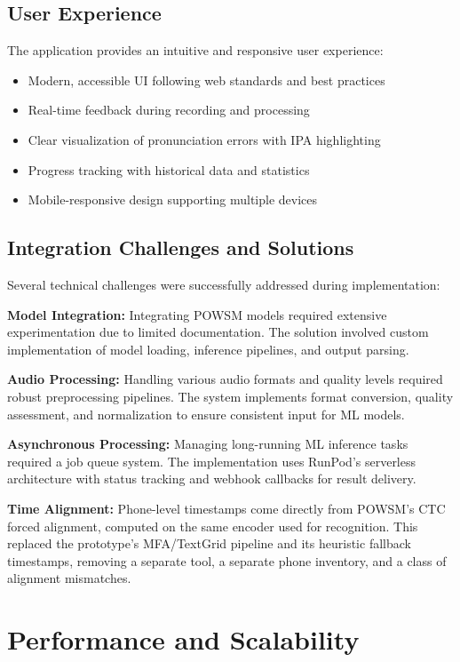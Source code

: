 \documentclass[a4paper,12pt]{report}
\begin{document}
\subsection{User Experience}

The application provides an intuitive and responsive user experience:
\begin{itemize}
    \item Modern, accessible UI following web standards and best practices
    \item Real-time feedback during recording and processing
    \item Clear visualization of pronunciation errors with IPA highlighting
    \item Progress tracking with historical data and statistics
    \item Mobile-responsive design supporting multiple devices
\end{itemize}

\subsection{Integration Challenges and Solutions}

Several technical challenges were successfully addressed during implementation:

\textbf{Model Integration:} Integrating POWSM \cite{powsm} models required extensive experimentation due to limited documentation. The solution involved custom implementation of model loading, inference pipelines, and output parsing.

\textbf{Audio Processing:} Handling various audio formats and quality levels required robust preprocessing pipelines. The system implements format conversion, quality assessment, and normalization to ensure consistent input for ML models.

\textbf{Asynchronous Processing:} Managing long-running ML inference tasks required a job queue system. The implementation uses RunPod's serverless architecture with status tracking and webhook callbacks for result delivery.

\textbf{Time Alignment:} Phone-level timestamps come directly from POWSM's CTC forced alignment, computed on the same encoder used for recognition. This replaced the prototype's MFA/TextGrid pipeline and its heuristic fallback timestamps, removing a separate tool, a separate phone inventory, and a class of alignment mismatches.

\section{Performance and Scalability}
\end{document}
